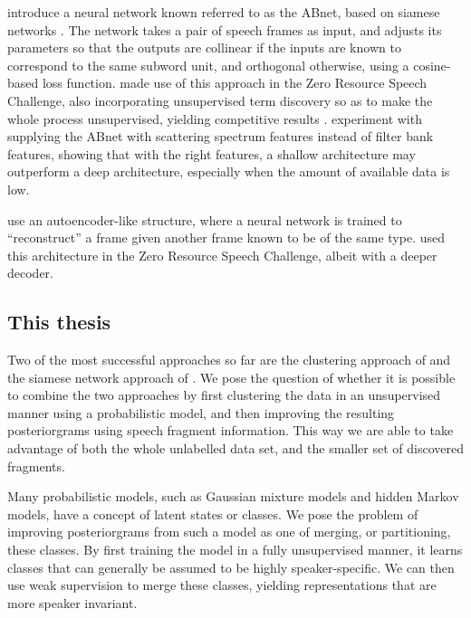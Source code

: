 \textcite{synnaeve2014phonetics} introduce a neural network known referred to as the ABnet, based on siamese networks \parencite{bromley1994signature}.
The network takes a pair of speech frames as input, and adjusts its parameters so that the outputs are collinear if the inputs are known to correspond to the same subword unit, and orthogonal otherwise, using a cosine-based loss function.
\textcite{thiolliere2015hybrid} made use of this approach in the Zero Resource Speech Challenge, also incorporating unsupervised term discovery so as to make the whole process unsupervised, yielding competitive results \parencite{versteegh2016zero}.
\textcite{zeghidour2016deep} experiment with supplying the ABnet with scattering spectrum features instead of filter bank features, showing that with the right features, a shallow architecture may outperform a deep architecture, especially when the amount of available data is low.

\textcite{kamper2015unsupervised} use an autoencoder-like structure, where a neural network is trained to ``reconstruct'' a frame given another frame known to be of the same type.
\textcite{renshaw2015comparison} used this architecture in the Zero Resource Speech Challenge, albeit with a deeper decoder.

\subsection{This thesis}

Two of the most successful approaches so far are the clustering approach of \textcite{chen2015parallel} and the siamese network approach of \textcite{thiolliere2015hybrid}.
We pose the question of whether it is possible to combine the two approaches by first clustering the data in an unsupervised manner using a probabilistic model, and then improving the resulting posteriorgrams using speech fragment information.
This way we are able to take advantage of both the whole unlabelled data set, and the smaller set of discovered fragments.

Many probabilistic models, such as Gaussian mixture models and hidden Markov models, have a concept of latent states or classes.
We pose the problem of improving posteriorgrams from such a model as one of merging, or partitioning, these classes.
By first training the model in a fully unsupervised manner, it learns classes that can generally be assumed to be highly speaker-specific.
We can then use weak supervision to merge these classes, yielding representations that are more speaker invariant.

